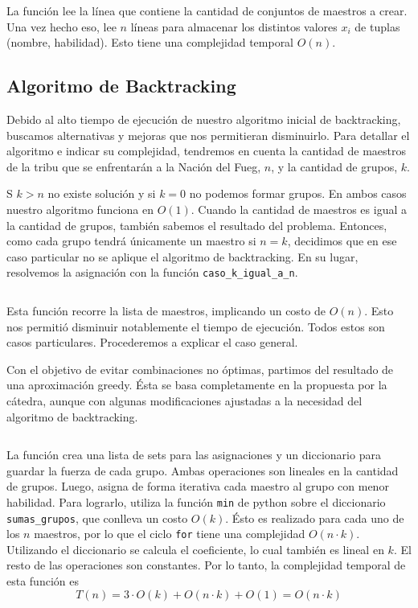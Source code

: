 \documentclass{article}
\begin{document}
La función lee la línea que contiene la cantidad de conjuntos de maestros a crear. Una vez hecho eso, lee $n$ líneas para almacenar los distintos valores $x_i$ de tuplas (nombre, habilidad). Esto tiene una complejidad temporal $O(n)$.

\subsection{Algoritmo de Backtracking}

Debido al alto tiempo de ejecución de nuestro algoritmo inicial de backtracking, buscamos alternativas y mejoras que nos permitieran disminuirlo. Para detallar el algoritmo e indicar su complejidad, tendremos en cuenta la cantidad de maestros de la tribu que se enfrentarán a la Nación del Fueg, $n$, y la cantidad de grupos, $k$.  

S $k > n$ no existe solución y si $k = 0$ no podemos formar grupos. En ambos casos nuestro algoritmo funciona en $O(1)$. Cuando la cantidad de maestros es igual a la cantidad de grupos, también sabemos el resultado del problema. Entonces, como cada grupo tendrá únicamente un maestro si $n = k$, decidimos que en ese caso particular no se aplique el algoritmo de backtracking. En su lugar, resolvemos la asignación con la función \texttt{caso\_k\_igual\_a\_n}.

\inputminted[linenos, firstline=75, lastline=81]{python}{codigo/backtracking_con_greedy.py}

Esta función recorre la lista de maestros, implicando un costo de $O(n)$. Esto nos permitió disminuir notablemente el tiempo de ejecución. Todos estos son casos particulares. Procederemos a explicar el caso general. 

Con el objetivo de evitar combinaciones no óptimas, partimos del resultado de una aproximación greedy. Ésta se basa completamente en la propuesta por la cátedra, aunque con algunas modificaciones ajustadas a la necesidad del algoritmo de backtracking.

\inputminted[linenos, firstline=83]{python}{codigo/backtracking_con_greedy.py}

La función crea una lista de sets para las asignaciones y un diccionario para guardar la fuerza de cada grupo. Ambas operaciones son lineales en la cantidad de grupos. Luego, asigna de forma iterativa cada maestro al grupo con menor habilidad. Para lograrlo, utiliza la función \texttt{min} de python sobre el diccionario \texttt{sumas\_grupos}, que conlleva un costo $O(k)$. Ésto es realizado para cada uno de los $n$ maestros, por lo que el ciclo \texttt{for} tiene una complejidad $O(n \cdot k)$. Utilizando el diccionario se calcula el coeficiente, lo cual también es lineal en $k$. El resto de las operaciones son constantes. Por lo tanto, la complejidad temporal de esta función es 
$$
T(n) = 3 \cdot O(k) + O(n \cdot k) + O(1) = O(n \cdot k)
$$
\end{document}
